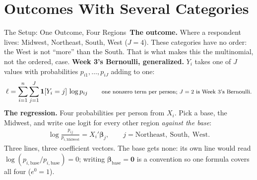 \documentclass[aspectratio=169,11pt,xcolor=dvipsnames]{beamer}
\newcommand{\loglik}{\ell}
\newcommand{\core}{\,\raisebox{0.6pt}{\textcolor{corestar}{$\bigstar$}}}
\begin{document}
\section[Several Categories]{Outcomes With Several Categories}
\begin{frame}\sectionpage\end{frame}

\begin{frame}{The Setup: One Outcome, Four Regions\core}
\textbf{The outcome.} Where a respondent lives: Midwest, Northeast,
South, West ($J = 4$). \alert{These categories have no order}: the West
is not ``more'' than the South. That is what makes this the multinomial,
not the ordered, case.
\vskip0pt
\textbf{Week 3's Bernoulli, generalized.} $Y_i$ takes one of $J$ values
with probabilities $p_{i1}, \dots, p_{iJ}$ adding to one:
\begingroup
\setlength{\abovedisplayskip}{2pt}\setlength{\belowdisplayskip}{2pt}
\begin{align*}
  \loglik = \sum_{i=1}^n \sum_{j=1}^J \mathbf 1[Y_i = j]\,\log p_{ij}
  \qquad\text{\footnotesize one nonzero term per person; $J = 2$ is Week 3's Bernoulli.}
\end{align*}
\endgroup
\textbf{The regression.} Four probabilities per person from $X_i$. Pick a
base, the Midwest, and write one logit for every other region
\emph{against the base}:
\begingroup
\setlength{\abovedisplayskip}{2pt}\setlength{\belowdisplayskip}{2pt}
\begin{align*}
  \log\frac{p_{ij}}{p_{i,\text{Midwest}}} = X_i'\bm\beta_j,
  \qquad j = \text{Northeast},\ \text{South},\ \text{West}.
\end{align*}
\endgroup
Three lines, three coefficient vectors. The base gets none: its own line
would read $\log(p_{i,\text{base}}/p_{i,\text{base}}) = 0$; writing
$\bm\beta_{\text{base}} = \bm 0$ is a convention so one formula covers all
four ($e^0 = 1$).
\end{frame}
\end{document}
